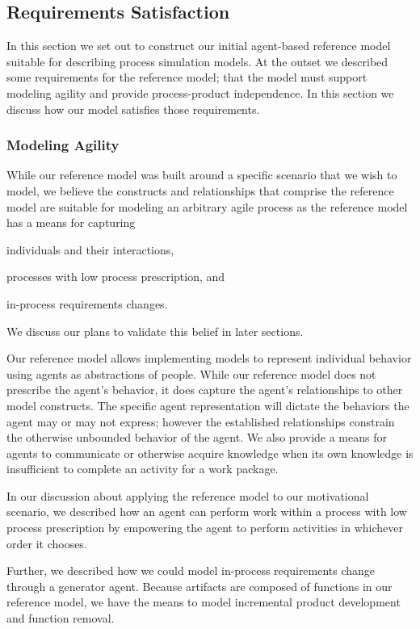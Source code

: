 \subsection{Requirements Satisfaction}\label{sec:discussion}

In this section we set out to construct our initial agent-based reference model
suitable for describing process simulation models.  At the outset we described
some requirements for the reference model; that the model must support modeling
agility and provide process-product independence.  In this section we discuss
how our model satisfies those requirements.

\subsubsection{Modeling Agility}
While our reference model was built around a specific scenario that we wish to
model, we believe the constructs and relationships that comprise the reference
model are suitable for modeling an arbitrary agile process as the reference
model has a means for capturing
\begin{inparaenum}[(1)]
    \item individuals and their interactions,
    \item processes with low process prescription, and
    \item in-process requirements changes.
\end{inparaenum}  We discuss our plans to validate this belief in later
sections.

Our reference model allows implementing models to represent individual behavior
using agents as abstractions of people.  While our reference model does not
prescribe the agent's behavior, it does capture the agent's relationships to
other model constructs.  The specific agent representation will dictate the
behaviors the agent may or may not express; however the established
relationships constrain the otherwise unbounded behavior of the agent.  We also
provide a means for agents to communicate or otherwise acquire knowledge when
its own knowledge is insufficient to complete an activity for a work package.

In our discussion about applying the reference model to our motivational
scenario, we described how an agent can perform work within a process with low
process prescription by empowering the agent to perform activities in whichever
order it chooses.  

Further, we described how we could model in-process requirements change through
a generator agent.  Because artifacts are composed of functions in our
reference model, we have the means to model incremental product development and 
function removal.


